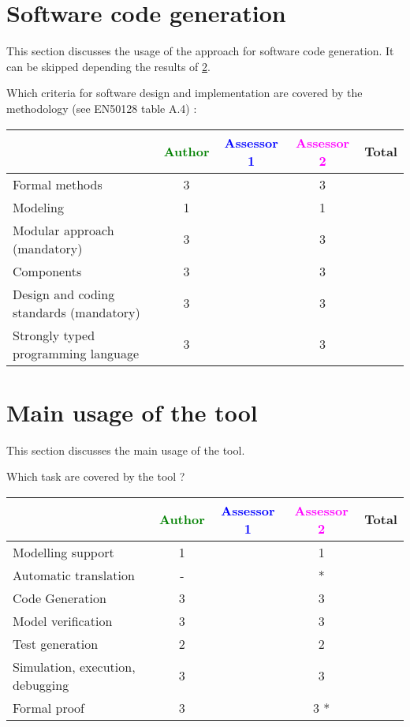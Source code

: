 \section{Software code generation}
This section discusses the usage of the approach for software code generation.
It can be skipped depending the results of \ref{main_usage}.

Which criteria for software design and implementation are covered by the methodology
(see EN50128 table A.4) :

\begin{tabular}{|l | c | c | c | c|}
\hline
& \textcolor{green}{Author} & \textcolor{blue}{Assessor 1} & \textcolor{magenta}{Assessor 2} & Total \\
\hline
Formal methods  & 3    & & 3    &  \\
\hline 
Modeling  & 1    & & 1    &  \\
\hline
Modular approach (mandatory) & 3    & & 3    &  \\
\hline
Components & 3    & & 3    &  \\
\hline
Design and coding standards (mandatory) & 3    & & 3    &  \\
\hline
Strongly typed programming language & 3    & & 3    &  \\
\hline

\end{tabular}



\section{Main usage of the tool}
\label{main_usage}

This section discusses the main usage of the tool.

Which task are covered by the tool ?


\begin{tabular}{|l | c | c | c | c|}
\hline
& \textcolor{green}{Author} & \textcolor{blue}{Assessor 1} & \textcolor{magenta}{Assessor 2} & Total \\
\hline 
Modelling support & 1    & & 1    &  \\
\hline
Automatic translation  & - & & * & \\
\hline
Code Generation  & 3    & & 3    & \\
\hline
Model verification & 3    & & 3    & \\
\hline
Test generation & 2    & & 2    & \\
\hline
Simulation, execution, debugging & 3    & & 3    & \\
\hline
Formal proof & 3    & & 3   * & \\
\hline
\end{tabular}

